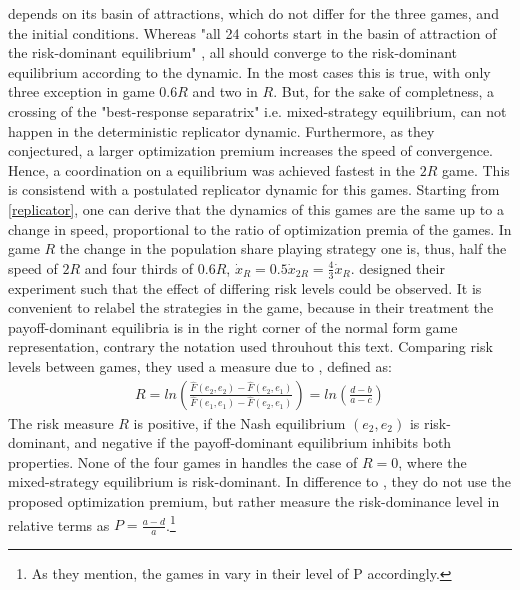 \documentclass[12pt]{article}
\begin{document}
depends on its basin of attractions, which do not differ for the three games, 
and the initial conditions. Whereas "all 24 cohorts start in the basin of attraction
of the risk-dominant equilibrium" \parencite{battalio_optimization_2001}, 
all should converge to the risk-dominant equilibrium according to the dynamic.
In the most cases this is true, with only three exception in game $0.6R$ 
and two in $R$.
But, for the sake of completness, a crossing of the  
"best-response separatrix" \parencite{battalio_optimization_2001} i.e. 
mixed-strategy equilibrium, can not happen in the deterministic replicator 
dynamic.
Furthermore, as they conjectured, a larger
optimization premium increases the speed of convergence. Hence, a coordination
on a equilibrium was achieved fastest in the $2R$ game. 
This is consistend with a postulated replicator dynamic for this games. 
Starting from \ref{replicator}, one can derive that the dynamics of this games
are the same up to a change in speed, proportional to the ratio of 
optimization premia of the games. In game $R$ the change in the population share
playing strategy one is, thus, half the speed of $2R$ and four thirds of $0.6R$,
$\dot{x}_{R} = 0.5 \dot{x}_{2R} = \frac{4}{3}\dot{x}_R$.
\textcite{schmidt_playing_2003} designed their experiment such that the effect
of differing risk levels could be observed. It is convenient to relabel 
the strategies in the game, because in their treatment the payoff-dominant 
equilibria is in the right corner of the normal form game representation,
contrary the notation used throuhout this text. Comparing risk levels between
games, they used a measure due to \cite{Seltenanaxiomaticriskmeasure}, defined
as:
\begin{align}
        \label{riskmeasureschmidt}
        R = ln\left(\frac{\hat{F}(e_2,e_2) -\hat{F}(e_2,e_1)}{\hat{F}(e_1,e_1) 
        -\hat{F}(e_2,e_1)}\right) = ln \left(\frac{d-b}{a-c}\right)
\end{align}
The risk measure $R$ is positive, if the Nash equilibrium $(e_2,e_2)$ is
risk-dominant, and negative if the payoff-dominant equilibrium inhibits both
properties.
None of the four games in \textcite{schmidt_playing_2003} handles
the case of $R=0$, where the mixed-strategy equilibrium is risk-dominant.
In difference to \textcite{battalio_optimization_2001}, they do not
use the proposed optimization premium, but rather measure the risk-dominance 
level in relative terms as $P=\frac{a-d}{a}$.\footnote{As they mention, the 
games in \textcite{battalio_optimization_2001} vary in their level of 
P accordingly.}
\end{document}
